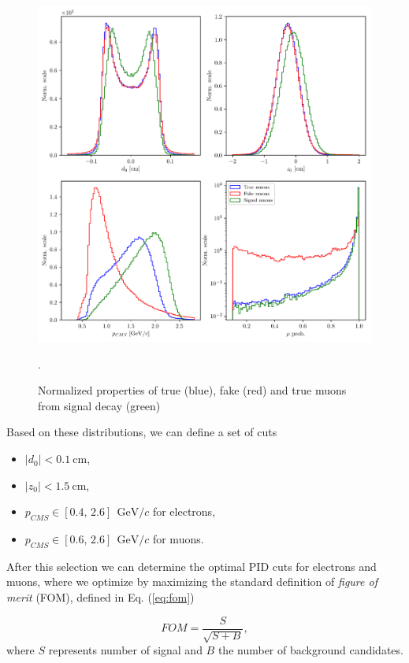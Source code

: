 \documentclass[  headings=standardclasses,
  headings=big,oneside,a4paper,openany,12pt]{scrbook}
\newcommand {\e}[1]{\mathrm{~#1}}
\begin{document}
\begin{figure}[H]
\centering
\includegraphics[width=\linewidth]{fig/FSP_mu_vars}
\captionsetup{width=.8\linewidth}
\caption{Normalized properties of true (blue), fake (red) and true muons from signal decay (green)}.
\label{fig:muvars}
\end{figure}

Based on these distributions, we can define a set of cuts
\begin{itemize}
\item $\vert d_0 \vert < 0.1\e{cm}$,
\item $\vert z_0 \vert < 1.5\e{cm}$,
\item $p_{CMS} \in [0.4,\,2.6]~\e{GeV}/c$ for electrons,
\item $p_{CMS} \in [0.6,\,2.6]~\e{GeV}/c$ for muons.
\end{itemize}

After this selection we can determine the optimal PID cuts for electrons and muons, where we optimize by maximizing the standard definition of \textit{figure of merit} (FOM), defined in Eq. (\ref{eq:fom})

\begin{equation}
\label{eq:fom}
FOM = \frac{S}{\sqrt{S+B}},
\end{equation} 
where $S$ represents number of signal and $B$ the number of background candidates.
\end{document}
